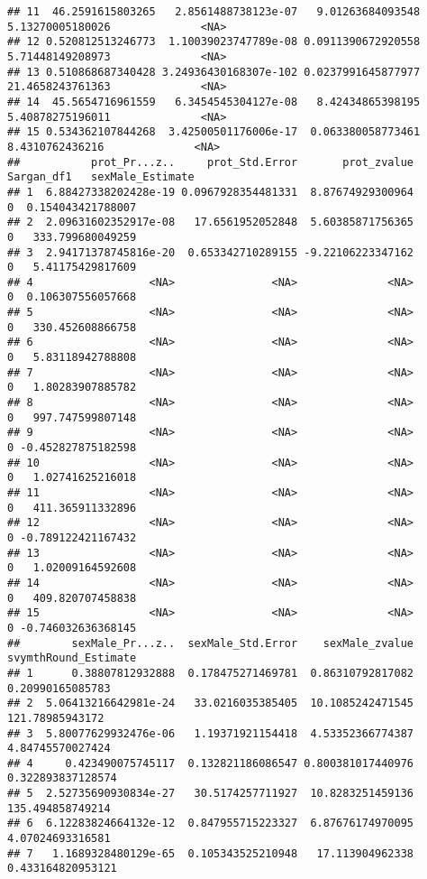 \documentclass[
]{book}
\begin{document}
\begin{verbatim}
## 11  46.2591615803265   2.8561488738123e-07   9.01263684093548 5.13270005180026              <NA>
## 12 0.520812513246773  1.10039023747789e-08 0.0911390672920558 5.71448149208973              <NA>
## 13 0.510868687340428 3.24936430168307e-102 0.0237991645877977 21.4658243761363              <NA>
## 14  45.5654716961559   6.3454545304127e-08   8.42434865398195 5.40878275196011              <NA>
## 15 0.534362107844268  3.42500501176006e-17  0.063380058773461  8.4310762436216              <NA>
##           prot_Pr...z..     prot_Std.Error       prot_zvalue Sargan_df1   sexMale_Estimate
## 1  6.88427338202428e-19 0.0967928354481331  8.87674929300964          0  0.154043421788007
## 2  2.09631602352917e-08   17.6561952052848  5.60385871756365          0   333.799680049259
## 3  2.94171378745816e-20  0.653342710289155 -9.22106223347162          0   5.41175429817609
## 4                  <NA>               <NA>              <NA>          0  0.106307556057668
## 5                  <NA>               <NA>              <NA>          0   330.452608866758
## 6                  <NA>               <NA>              <NA>          0   5.83118942788808
## 7                  <NA>               <NA>              <NA>          0   1.80283907885782
## 8                  <NA>               <NA>              <NA>          0   997.747599807148
## 9                  <NA>               <NA>              <NA>          0 -0.452827875182598
## 10                 <NA>               <NA>              <NA>          0   1.02741625216018
## 11                 <NA>               <NA>              <NA>          0   411.365911332896
## 12                 <NA>               <NA>              <NA>          0 -0.789122421167432
## 13                 <NA>               <NA>              <NA>          0   1.02009164592608
## 14                 <NA>               <NA>              <NA>          0   409.820707458838
## 15                 <NA>               <NA>              <NA>          0 -0.746032636368145
##        sexMale_Pr...z..  sexMale_Std.Error    sexMale_zvalue svymthRound_Estimate
## 1      0.38807812932888  0.178475271469781  0.86310792817082     0.20990165085783
## 2  5.06413216642981e-24   33.0216035385405  10.1085242471545      121.78985943172
## 3  5.80077629932476e-06   1.19371921154418  4.53352366774387     4.84745570027424
## 4     0.423490075745117  0.132821186086547 0.800381017440976    0.322893837128574
## 5  2.52735690930834e-27   30.5174257711927  10.8283251459136     135.494858749214
## 6  6.12283824664132e-12  0.847955715223327  6.87676174970095     4.07024693316581
## 7   1.1689328480129e-65  0.105343525210948   17.113904962338    0.433164820953121

\end{verbatim}
\end{document}

